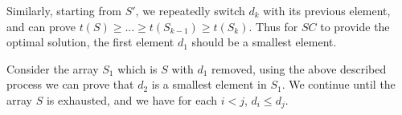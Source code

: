 \documentclass{article}
\begin{document}
\begin{description}
  Similarly, starting from $S'$, we repeatedly switch $d_k$ with its previous element, and can prove $t(S) \geq...\geq t(S_{k-1}) \geq t(S_k)$. Thus for $SC$ to provide the optimal solution, the first element $d_1$ should be a smallest element.

  Consider the array $S_1$ which is $S$ with $d_1$ removed, using the above described process we can prove that $d_2$ is a smallest element in $S_1$. We continue until the array $S$ is exhausted, and we have for each $i<j$, $d_i \leq d_j$.

\end{description}
\end{document}
